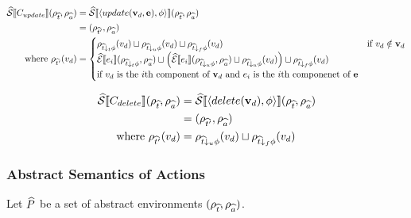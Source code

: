 \begin{align}
    \widehat{\mathcal{S}} \llbracket C_{update} \rrbracket(\rho_{\widehat{t}}, \rho_{\widehat{a}})
                                              & = \widehat{\mathcal{S}} \llbracket \langle update(\mathbf{v}_d, \mathbf{e}), \phi \rangle \rrbracket (\rho_{\widehat{t}}, \rho_{\widehat{a}}) \\
                                              & = (\rho_{\widehat{t}'}, \rho_{\widehat{a}})                                                                 \\
    \text{where } \rho_{\widehat{t}'}(v_d) & =
    \begin{cases}
        \rho_{\widehat{t} \downarrow_t \phi}(v_d) \sqcup \rho_{\widehat{t} \downarrow_u \phi}(v_d) \sqcup \rho_{\widehat{t} \downarrow_f \phi}(v_d) & \text{if } v_d \notin \mathbf{v}_d \\
        \widehat{\mathcal{E}}\llbracket e_{i} \rrbracket(\rho_{\widehat{t} \downarrow_t \phi}, \rho_{\widehat{a}}) \sqcup
        \left( \widehat{\mathcal{E}}\llbracket e_{i} \rrbracket(\rho_{\widehat{t} \downarrow_u \phi}, \rho_{\widehat{a}}) \sqcup \rho_{\widehat{t} \downarrow_u \phi}(v_d) \right) \sqcup \rho_{\widehat{t} \downarrow_f \phi}(v_d) \\
        \text{if $v_d$ is the $i$th component of $\mathbf{v}_d$ and $e_{i}$ is the $i$th componenet of $\mathbf{e}$} \\
    \end{cases}
\end{align}

\begin{align*}
    \widehat{\mathcal{S}} \llbracket C_{delete} \rrbracket(\rho_{\widehat{t}}, \rho_{\widehat{a}})
    &= \widehat{\mathcal{S}} \llbracket \langle delete(\mathbf{v}_d), \phi \rangle \rrbracket (\rho_{\widehat{t}}, \rho_{\widehat{a}}) \\
    &= (\rho_{\widehat{t}'}, \rho_{\widehat{a}}) \\
    \text{where } \rho_{\widehat{t}'}(v_d) &= \rho_{\widehat{t} \downarrow_u \phi}(v_d) \sqcup \rho_{\widehat{t} \downarrow_f \phi}(v_d)
\end{align*}

\subsubsection{Abstract Semantics of Actions}

Let $\widehat{P}$ be a set of abstract environments $(\rho_{\widehat{t}}, \rho_{\widehat{a}})$.

